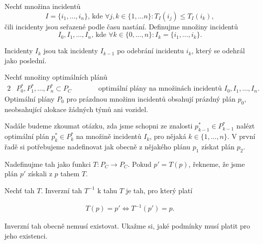 \begin{definice}\label{df:INC}
  Nechť množina incidentů 
  \begin{equation*}
    I = \{ i_1, \dots , i_n \} \text{, kde } \forall j, k \in \{ 1, \dots n\} \colon T_I(i_j) \leq T_I(i_k),
  \end{equation*}
  čili incidenty jsou seřazené podle času nastání.
  Definujme množiny incidentů
  \begin{equation*}
    I_0, I_1, \dots, I_n \text{, kde } \forall k \in \{ 0, \dots, n \} \colon I_k = \{ i_1, \dots, i_k \}.
  \end{equation*}

  Incidenty $I_k$ jsou tak incidenty $I_{k-1}$ po odebrání incidentu $i_k$, který se odehrál jako poslední.
\end{definice}

\begin{definice}
  Nechť množiny optimálních plánů
  \begin{alignat}{2}
    & P^*_0, P^*_1, \dots, P^*_{n} \subset P_C \quad && \hspace{15pt} \text{optimální plány na množinách incidentů $I_0, I_1, \dots, I_n$.}
  \end{alignat}
  Optimální plány $P_0$ pro prázdnou množinu incidentů obsahují prázdný plán $p_0$, neobsahující alokace žádných týmů ani vozidel.
\end{definice}

Nadále budeme zkoumat otázku, zda jsme schopni ze znalosti $p^*_{k-1} \in P^*_{k-1}$ nalézt optimální plán $p^*_k \in P^*_k$ na množině incidentů $I_k$, pro nějaká $k \in \{ 1, \dots, n \}$.
V první řadě si potřebujeme nadefinovat jak obecně z nějakého plánu $p_1$ získat plán $p_2$. 
\begin{definice}[Tah]\label{df:tah}
  Nadefinujme tah jako funkci $T \colon P_C \rightarrow P_C$.
  Pokud $p' = T(p)$, řekneme, že jsme plán $p'$ získali z $p$ tahem $T$.
\end{definice}

\begin{definice}\label{df:tah}
  Nechť tah $T$. Inverzní tah $T^{-1}$ k tahu $T$ je tah, pro který platí

  \begin{align*}
    T(p) = p' \Leftrightarrow T^{-1}(p') = p.
  \end{align*}
\end{definice}

Inverzní tah obecně nemusí existovat. Ukažme si, jaké podmínky musí platit pro jeho existenci.

